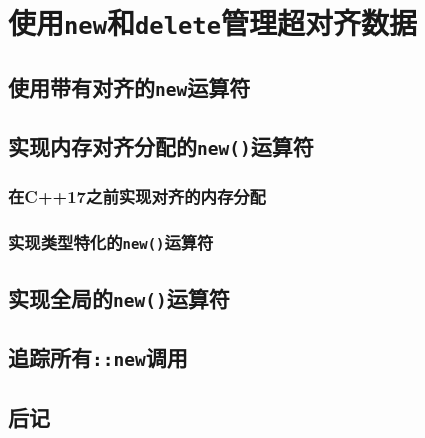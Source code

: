\section{使用\texttt{new}和\texttt{delete}管理超对齐数据}\label{ch30}

\subsection{使用带有对齐的\texttt{new}运算符}

\subsection{实现内存对齐分配的\texttt{new()}运算符}
\subsubsection{在C++17之前实现对齐的内存分配}
\subsubsection{实现类型特化的\texttt{new()}运算符}\label{ch30.2.2}

\subsection{实现全局的\texttt{new()}运算符}

\subsection{追踪所有\texttt{::new}调用}\label{ch30.4}

\subsection{后记}